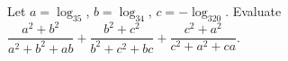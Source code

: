 Let $a=\log_35$, $b=\log_34$, $c=-\log_320$. Evaluate $\dfrac{a^2+b^2}{a^2+b^2+ab}+\dfrac{b^2+c^2}{b^2+c^2+bc}+\dfrac{c^2+a^2}{c^2+a^2+ca}$.
